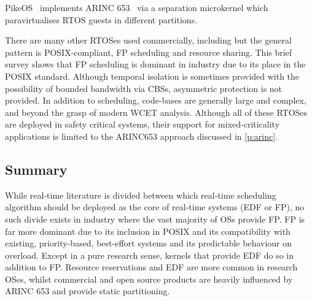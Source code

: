 PikeOS~\citep{PikeOS:URL} implements ARINC 653~\citep{ARINC653} via a separation
microkernel which paravirtualises RTOS guests in different partitions.

There are many other \gls{RTOS}es used commercially, including \citet{Deos:URL} but the general pattern is POSIX-compliant, \gls{FP} scheduling and resource sharing.
This brief survey shows that \gls{FP} scheduling is dominant in industry due to its place in the POSIX standard. 
Although temporal isolation is sometimes provided with the possibility of bounded bandwidth via
\glspl{CBS}, asymmetric protection is not provided.  In addition to scheduling, code-bases are
generally large and complex, and beyond the grasp of modern {\gls{WCET}} analysis.  Although all of
these \gls{RTOS}es are deployed in safety critical systems, their support for mixed-criticality
applications is limited to the ARINC653 approach discussed in \cref{p:arinc}. 

\subsection{Summary}

While real-time literature is divided between which real-time scheduling algorithm should be
deployed as the core of real-time systems (\gls{EDF} or \gls{FP}), no such divide exists in industry
where the vast majority of \glspl{OS} provide \gls{FP}.  \gls{FP} is far more dominant due to its
inclusion in \gls{POSIX} and its compatibility with existing, priority-based, best-effort systems and
its predictable behaviour on overload.  Except in a pure research sense, kernels that provide
\gls{EDF} do so in addition to \gls{FP}.  Resource reservations and \gls{EDF} are more common in
research OSes, whilst commercial and open source products are heavily influenced by ARINC 653 and
provide static partitioning. 
    
